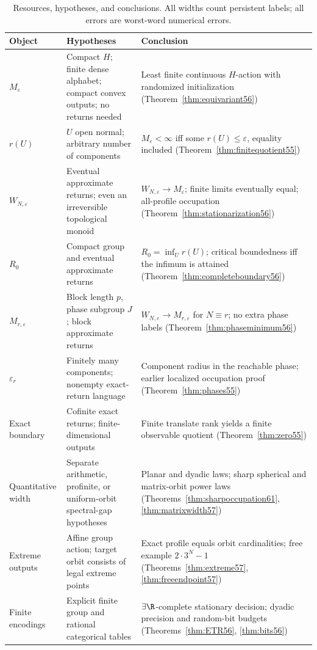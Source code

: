 \clearpage
\begin{table}[p]
\centering\small
\caption{Resources, hypotheses, and conclusions. All widths count persistent labels; all errors are worst-word numerical errors.}\label{tab:map56}
\begin{tabular}{>{\raggedright\arraybackslash}p{}>{\raggedright\arraybackslash}p{}>{\raggedright\arraybackslash}p{}}
\toprule
Object & Hypotheses & Conclusion\\
\midrule
$M_\varepsilon$ & Compact $H$; finite dense alphabet; compact convex outputs; no returns needed & Least finite continuous $H$-action with randomized initialization (Theorem~\ref{thm:equivariant56})\\[3pt]
$r(U)$ & $U$ open normal; arbitrary number of components & $M_\varepsilon<\infty$ iff some $r(U)\le\varepsilon$, equality included (Theorem~\ref{thm:finitequotient55})\\[3pt]
$W_{N,\varepsilon}$ & Eventual approximate returns; even an irreversible topological monoid & $W_{N,\varepsilon}\to M_\varepsilon$; finite limits eventually equal; all-profile occupation (Theorem~\ref{thm:stationarization56})\\[3pt]
$R_0$ & Compact group and eventual approximate returns & $R_0=\inf_Ur(U)$; critical boundedness iff the infimum is attained (Theorem~\ref{thm:completeboundary56})\\[3pt]
$M_{r,\varepsilon}$ & Block length $p$, phase subgroup $J$; block approximate returns & $W_{N,\varepsilon}\to M_{r,\varepsilon}$ for $N\equiv r$; no extra phase labels (Theorem~\ref{thm:phaseminimum56})\\[3pt]
$\varepsilon_r$ & Finitely many components; nonempty exact-return language & Component radius in the reachable phase; earlier localized occupation proof (Theorem~\ref{thm:phases55})\\[3pt]
Exact boundary & Cofinite exact returns; finite-dimensional outputs & Finite translate rank yields a finite observable quotient (Theorem~\ref{thm:zero55})\\[3pt]
Quantitative width & Separate arithmetic, profinite, or uniform-orbit spectral-gap hypotheses & Planar and dyadic laws; sharp spherical and matrix-orbit power laws (Theorems~\ref{thm:sharpoccupation61}, \ref{thm:matrixwidth57})\\[3pt]
Extreme outputs & Affine group action; target orbit consists of legal extreme points & Exact profile equals orbit cardinalities; free example $2\cdot3^N-1$ (Theorems~\ref{thm:extreme57}, \ref{thm:freeendpoint57})\\[3pt]
Finite encodings & Explicit finite group and rational categorical tables & $\exists\R$-complete stationary decision; dyadic precision and random-bit budgets (Theorems~\ref{thm:ETR56}, \ref{thm:bits56})\\
\bottomrule
\end{tabular}
\end{table}
\clearpage

